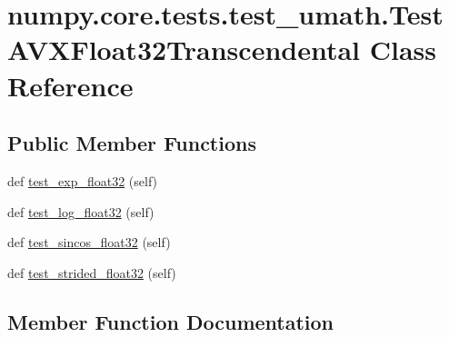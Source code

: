 \hypertarget{classnumpy_1_1core_1_1tests_1_1test__umath_1_1TestAVXFloat32Transcendental}{}\section{numpy.\+core.\+tests.\+test\+\_\+umath.\+Test\+A\+V\+X\+Float32\+Transcendental Class Reference}
\label{classnumpy_1_1core_1_1tests_1_1test__umath_1_1TestAVXFloat32Transcendental}
\subsection*{Public Member Functions}
\begin{DoxyCompactItemize}
\item 
def \hyperlink{classnumpy_1_1core_1_1tests_1_1test__umath_1_1TestAVXFloat32Transcendental_a82c41a3963c01af68f49e4b79797658e}{test\+\_\+exp\+\_\+float32} (self)
\item 
def \hyperlink{classnumpy_1_1core_1_1tests_1_1test__umath_1_1TestAVXFloat32Transcendental_a7747592b3d8d92955a21d940e73f6336}{test\+\_\+log\+\_\+float32} (self)
\item 
def \hyperlink{classnumpy_1_1core_1_1tests_1_1test__umath_1_1TestAVXFloat32Transcendental_ad84048fb6797884741b1f7f0b1d34763}{test\+\_\+sincos\+\_\+float32} (self)
\item 
def \hyperlink{classnumpy_1_1core_1_1tests_1_1test__umath_1_1TestAVXFloat32Transcendental_a2698d0b2196c4593d6b495d8ee6b87f3}{test\+\_\+strided\+\_\+float32} (self)
\end{DoxyCompactItemize}


\subsection{Member Function Documentation}
\mbox{\label{classnumpy_1_1core_1_1tests_1_1test__umath_1_1TestAVXFloat32Transcendental_a82c41a3963c01af68f49e4b79797658e}} 
